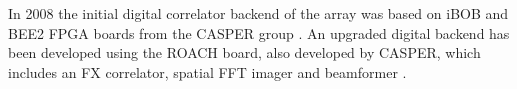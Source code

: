 \documentclass[useAMS,macros,usenatbib]{mn2e}
\begin{document}
In 2008 the initial digital correlator backend of the array was based on iBOB and BEE2 FPGA boards from the CASPER group \citep{best2-casper}.
An upgraded digital backend has been developed using the ROACH board, also developed by CASPER, which includes an FX correlator, spatial FFT imager and beamformer \citep{med_inst}.
\end{document}

